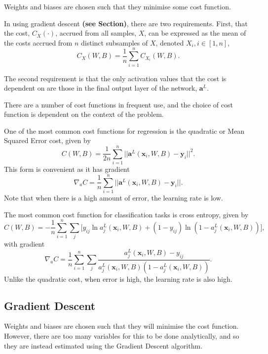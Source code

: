 \documentclass[honours,12pt]{unswthesis}
\numberwithin{equation}{section}
\begin{document}
Weights and biases are chosen such that they minimise some cost function.

In using gradient descent \textbf{(see Section)}, there are two requirements. First, that the cost, $C_X(\cdot)$, accrued from all samples, $X$, can be expressed as the mean of the costs accrued from $n$ distinct subsamples of $X$, denoted $X_i, i \in[1,n]$,
\[
	C_X(W, B) = \dfrac{1}{n}\sum_{i = 1}^nC_{X_i}(W,B).
\]

The second requirement is that the only activation values that the cost is dependent on are those in the final output layer of the network, $\mathbf{a}^L$.

There are a number of cost functions in frequent use, and the choice of cost function is dependent on the context of the problem.

One of the most common cost functions for regression is the quadratic or Mean Squared Error cost, given by
\[
	C(W,B) = \dfrac{1}{2n}\sum_{i=1}^n||\mathbf{a}^L(\mathbf{x}_i,W,B) - \mathbf{y}_i ||^2.
\]
This form is convenient as it has gradient
\[
	\nabla_aC = \dfrac{1}{n}\sum_{i=1}^n||\mathbf{a}^L(\mathbf{x}_i,W,B) - \mathbf{y}_i ||.
\]
Note that when there is a high amount of error, the learning rate is low.

The most common cost function for classification tasks is cross entropy, given by
\[
	C(W,B) = -\dfrac{1}{n}\sum_{i=1}^n\sum_j\big[y_{ij}\ln a_j^L(\mathbf{x}_i,W,B) + (1 - y_{ij})\ln (1 - a_j^L(\mathbf{x}_i,W,B))\big],
\]
with gradient
\[
	\nabla_aC = \dfrac{1}{n}\sum_{i=1}^n\sum_j\dfrac{a_j^L(\mathbf{x}_i,W,B) - y_{ij}}{a_j^L(\mathbf{x}_i,W,B)(1-a_j^L(\mathbf{x}_i,W,B))}.
\]
Unlike the quadratic cost, when error is high, the learning rate is also high.


\subsection{Gradient Descent}\label{nnets-graddesc}

Weights and biases are chosen such that they will minimise the cost function. However, there are too many variables for this to be done analytically, and so they are instead estimated using the Gradient Descent algorithm.
\end{document}

